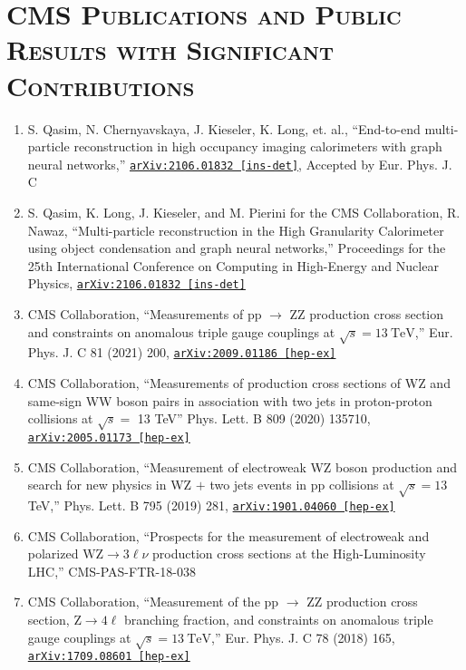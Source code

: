\documentclass[10pt]{res} %
\begin{document}
\begin{resume}
\begin{itemize}
\end{itemize}

\section{\textsc{CMS Publications and Public Results with Significant Contributions}}
\begin{enumerate}
  \item S. Qasim, N. Chernyavskaya, J. Kieseler, K. Long, et. al., ``End-to-end multi-particle reconstruction in high occupancy imaging calorimeters with graph neural networks,'' \href{https://arxiv.org/abs/2106.01832}{\texttt{arXiv:2106.01832 [ins-det]}}, Accepted by Eur. Phys. J. C
  \item S. Qasim, K. Long, J. Kieseler, and M. Pierini for the CMS Collaboration, R. Nawaz, ``Multi-particle reconstruction in the High Granularity Calorimeter using object condensation and graph neural networks,'' Proceedings for the 25th International Conference on Computing in High-Energy and Nuclear Physics, \href{https://arxiv.org/abs/2106.01832}{\texttt{arXiv:2106.01832 [ins-det]}} 
  \item CMS Collaboration, ``Measurements of pp $\rightarrow$ ZZ production cross section and constraints on anomalous triple gauge couplings at $\sqrt{s} = 13~\mathrm{TeV}$,'' Eur. Phys. J. C 81 (2021) 200, \href{https://arxiv.org/abs/2009.01186}{\texttt{arXiv:2009.01186 [hep-ex]}}
  \item CMS Collaboration, ``Measurements of production cross sections of WZ and same-sign WW boson pairs in association with two jets in proton-proton collisions at $\sqrt{s} =$ 13 TeV'' Phys. Lett. B 809 (2020) 135710, \href{https://arxiv.org/abs/2005.01173}{\texttt{arXiv:2005.01173 [hep-ex]}}
  \item CMS Collaboration, ``Measurement of electroweak WZ boson production and search for new physics in WZ $+$ two jets events in pp collisions at $\sqrt{s}=13$\,TeV,'' Phys. Lett. B 795 (2019) 281, \href{https://arxiv.org/abs/1901.04060} {\texttt{arXiv:1901.04060 [hep-ex]}}
  \item CMS Collaboration, ``Prospects for the measurement of electroweak and polarized $\mathrm{WZ}\to3\ell\nu$ production cross sections at the High-Luminosity LHC,'' CMS-PAS-FTR-18-038
  \item CMS Collaboration, ``Measurement of the pp $\rightarrow$ ZZ production cross section, $\mathrm{Z} \to 4\ell$ branching fraction, and constraints on anomalous triple gauge couplings at $\sqrt{s} = 13~\mathrm{TeV}$,'' Eur. Phys. J. C 78 (2018) 165, \href{https://arxiv.org/abs/1709.08601}{\texttt{arXiv:1709.08601 [hep-ex]}}

\end{enumerate}
\end{resume}
\end{document}
